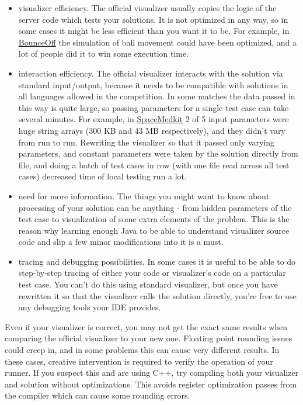 \documentclass[]{article}
\begin{document}
\begin{itemize}
\item
  visualizer efficiency. The official visualizer usually copies the
  logic of the server code which tests your solutions. It is not
  optimized in any way, so in some cases it might be less efficient than
  you want it to be. For example, in
  \href{http://www.topcoder.com/longcontest/?module=ViewProblemStatement\&rd=13768\&pm=10372}{BounceOff}
  the simulation of ball movement could have been optimized, and a lot
  of people did it to win some execution time.
\item
  interaction efficiency. The official visualizer interacts with the
  solution via standard input/output, because it needs to be compatible
  with solutions in all languages allowed in the competition. In some
  matches the data passed in this way is quite large, so passing
  parameters for a single test case can take several minutes. For
  example, in
  \href{http://www.topcoder.com/longcontest/?module=ViewProblemStatement\&rd=14002\&pm=10680}{SpaceMedkit}
  2 of 5 input parameters were huge string arrays (300 KB and 43 MB
  respectively), and they didn't vary from run to run. Rewriting the
  visualizer so that it passed only varying parameters, and constant
  parameters were taken by the solution directly from file, and doing a
  batch of test cases in row (with one file read across all test cases)
  decreased time of local testing run a lot.
\item
  need for more information. The things you might want to know about
  processing of your solution can be anything - from hidden parameters
  of the test case to visualization of some extra elements of the
  problem. This is the reason why learning enough Java to be able to
  understand visualizer source code and slip a few minor modifications
  into it is a must.
\item
  tracing and debugging possibilities. In some cases it is useful to be
  able to do step-by-step tracing of either your code or visualizer's
  code on a particular test case. You can't do this using standard
  visualizer, but once you have rewritten it so that the visualizer
  calls the solution directly, you're free to use any debugging tools
  your IDE provides.
\end{itemize}

Even if your visualizer is correct, you may not get the exact same
results when comparing the official visualizer to your new one. Floating
point rounding issues could creep in, and in some problems this can
cause very different results. In these cases, creative intervention is
required to verify the operation of your runner. If you suspect this and
are using C++, try compiling both your visualizer and solution without
optimizations. This avoids register optimization passes from the
compiler which can cause some rounding errors.
\end{document}
